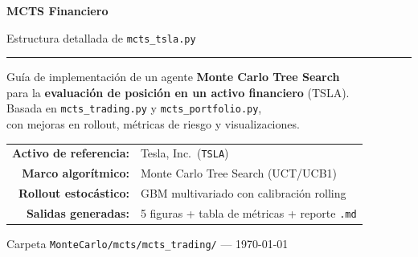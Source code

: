 \documentclass[12pt, a4paper]{article}
\begin{document}
\begin{titlepage}
  \centering
  \vspace*{1.8cm}
  {\Huge\bfseries\color{azuloscuro} MCTS Financiero\par}
  \vspace{0.4cm}
  {\LARGE\color{gray!80!black} Estructura detallada de \texttt{mcts\_tsla.py}\par}
  \vspace{1.2cm}
  \rule{0.6\linewidth}{1pt}
  \vspace{0.8cm}

  \begin{tcolorbox}[colback=azulclaro, colframe=azuloscuro, width=0.88\linewidth]
    \centering\small
    Guía de implementación de un agente \textbf{Monte Carlo Tree Search}\\
    para la \textbf{evaluación de posición en un activo financiero} (TSLA).\\[4pt]
    Basada en \texttt{mcts\_trading.py} y \texttt{mcts\_portfolio.py},\\
    con mejoras en rollout, métricas de riesgo y visualizaciones.
  \end{tcolorbox}

  \vspace{1.2cm}
  \begin{tabular}{rl}
    \textbf{Activo de referencia:} & Tesla, Inc.\ (\texttt{TSLA}) \\[3pt]
    \textbf{Marco algorítmico:}    & Monte Carlo Tree Search (UCT/UCB1) \\[3pt]
    \textbf{Rollout estocástico:}  & GBM multivariado con calibración rolling \\[3pt]
    \textbf{Salidas generadas:}    & 5 figuras + tabla de métricas + reporte \texttt{.md} \\
  \end{tabular}

  \vfill
  {\small\color{gray} Carpeta \texttt{MonteCarlo/mcts/mcts\_trading/} \quad --- \quad \today}
\end{titlepage}

\tableofcontents
\newpage

\end{document}
